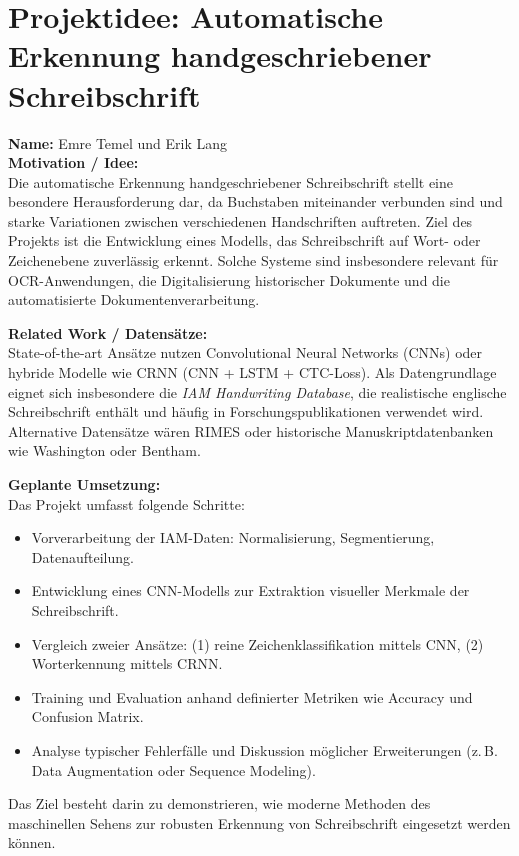 \documentclass[a4paper,12pt]{article}
\begin{document}
	
	\section*{Projektidee: Automatische Erkennung handgeschriebener Schreibschrift}
	
	\textbf{Name:} Emre Temel und Erik Lang  \\[4pt]
	
	\textbf{Motivation / Idee:}\\
	Die automatische Erkennung handgeschriebener Schreibschrift stellt eine besondere Herausforderung dar, da Buchstaben miteinander verbunden sind und starke Variationen zwischen verschiedenen Handschriften auftreten. Ziel des Projekts ist die Entwicklung eines Modells, das Schreibschrift auf Wort- oder Zeichenebene zuverlässig erkennt. Solche Systeme sind insbesondere relevant für OCR-Anwendungen, die Digitalisierung historischer Dokumente und die automatisierte Dokumentenverarbeitung.
	
	\vspace{6pt}
	
	\textbf{Related Work / Datensätze:}\\
	State-of-the-art Ansätze nutzen Convolutional Neural Networks (CNNs) oder hybride Modelle wie CRNN (CNN + LSTM + CTC-Loss). Als Datengrundlage eignet sich insbesondere die \textit{IAM Handwriting Database}, die realistische englische Schreibschrift enthält und häufig in Forschungspublikationen verwendet wird. Alternative Datensätze wären RIMES oder historische Manuskriptdatenbanken wie Washington oder Bentham.
	
	\vspace{6pt}
	
	\textbf{Geplante Umsetzung:}\\
	Das Projekt umfasst folgende Schritte:
	\begin{itemize}
		\item Vorverarbeitung der IAM-Daten: Normalisierung, Segmentierung, Datenaufteilung.
		\item Entwicklung eines CNN-Modells zur Extraktion visueller Merkmale der Schreibschrift.
		\item Vergleich zweier Ansätze: (1) reine Zeichenklassifikation mittels CNN, (2) Worterkennung mittels CRNN.
		\item Training und Evaluation anhand definierter Metriken wie Accuracy und Confusion Matrix.
		\item Analyse typischer Fehlerfälle und Diskussion möglicher Erweiterungen (z.\,B. Data Augmentation oder Sequence Modeling).
	\end{itemize}
	
	Das Ziel besteht darin zu demonstrieren, wie moderne Methoden des maschinellen Sehens zur robusten Erkennung von Schreibschrift eingesetzt werden können.
	
\end{document}
